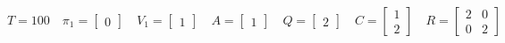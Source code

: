 \documentclass{standalone}
\begin{document}
    \( \displaystyle
        T = 100 \quad
        \pi_1 = \begin{bmatrix} 0 \end{bmatrix} \quad
        V_1 = \begin{bmatrix} 1 \end{bmatrix} \quad
        A = \begin{bmatrix} 1 \end{bmatrix} \quad
        Q = \begin{bmatrix} 2 \end{bmatrix} \quad
        C = \begin{bmatrix} 1 \\ 2 \end{bmatrix} \quad
        R = \begin{bmatrix} 2 & 0 \\ 0 & 2 \end{bmatrix}
    \)
\end{document}
